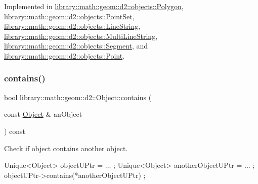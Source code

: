 Implemented in \hyperlink{classlibrary_1_1math_1_1geom_1_1d2_1_1objects_1_1_polygon_a15bbbe7e468a50d6059e2df946175e1c}{library\+::math\+::geom\+::d2\+::objects\+::\+Polygon}, \hyperlink{classlibrary_1_1math_1_1geom_1_1d2_1_1objects_1_1_point_set_ad867c4fb86734efe968a39c95eba53b3}{library\+::math\+::geom\+::d2\+::objects\+::\+Point\+Set}, \hyperlink{classlibrary_1_1math_1_1geom_1_1d2_1_1objects_1_1_line_string_a5b503802b279c6c305fed6a07a893ad2}{library\+::math\+::geom\+::d2\+::objects\+::\+Line\+String}, \hyperlink{classlibrary_1_1math_1_1geom_1_1d2_1_1objects_1_1_multi_line_string_a38054f0f0a2c198b5d3c76ef22562e30}{library\+::math\+::geom\+::d2\+::objects\+::\+Multi\+Line\+String}, \hyperlink{classlibrary_1_1math_1_1geom_1_1d2_1_1objects_1_1_segment_a6149a3cf215b0b573d5bd4f25fad75e9}{library\+::math\+::geom\+::d2\+::objects\+::\+Segment}, and \hyperlink{classlibrary_1_1math_1_1geom_1_1d2_1_1objects_1_1_point_aa6b55bdbf5a0ce9ec8bc91ca79de3569}{library\+::math\+::geom\+::d2\+::objects\+::\+Point}.

\mbox{\label{classlibrary_1_1math_1_1geom_1_1d2_1_1_object_a7bc14e621db51aec72eff0fa5da295ac}} 
\subsubsection{\texorpdfstring{contains()}{contains()}}
{\footnotesize\ttfamily bool library\+::math\+::geom\+::d2\+::\+Object\+::contains (\begin{DoxyParamCaption}\item[{const \hyperlink{classlibrary_1_1math_1_1geom_1_1d2_1_1_object}{Object} \&}]{an\+Object }\end{DoxyParamCaption}) const\hspace{0.3cm}{\ttfamily [virtual]}}



Check if object contains another object. 


\begin{DoxyCode}
Unique<Object> objectUPtr = ... ;
Unique<Object> anotherObjectUPtr = ... ;
objectUPtr->contains(*anotherObjectUPtr) ;
\end{DoxyCode}



